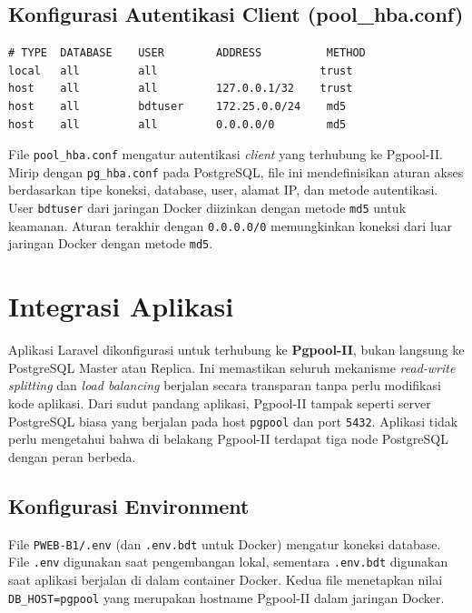 \subsection{Konfigurasi Autentikasi Client (pool\_hba.conf)}

\begin{lstlisting}[caption={Konfigurasi pool\_hba.conf
(docker/pgpool/pool\_hba.conf)}, label={lst:pool-hba}]
# TYPE  DATABASE    USER        ADDRESS          METHOD
local   all         all                         trust
host    all         all         127.0.0.1/32    trust
host    all         bdtuser     172.25.0.0/24    md5
host    all         all         0.0.0.0/0        md5
\end{lstlisting}

File \texttt{pool\_hba.conf} mengatur autentikasi \textit{client} yang
terhubung ke Pgpool-II. Mirip dengan \texttt{pg\_hba.conf} pada
PostgreSQL, file ini mendefinisikan aturan akses berdasarkan tipe
koneksi, database, user, alamat IP, dan metode autentikasi. User
\texttt{bdtuser} dari jaringan Docker diizinkan dengan metode
\texttt{md5} untuk keamanan. Aturan terakhir dengan \texttt{0.0.0.0/0}
memungkinkan koneksi dari luar jaringan Docker dengan metode
\texttt{md5}.

\section{Integrasi Aplikasi}

Aplikasi Laravel dikonfigurasi untuk terhubung ke
\textbf{Pgpool-II}, bukan langsung ke PostgreSQL Master atau Replica.
Ini memastikan seluruh mekanisme \textit{read-write splitting} dan
\textit{load balancing} berjalan secara transparan tanpa perlu
modifikasi kode aplikasi. Dari sudut pandang aplikasi, Pgpool-II
tampak seperti server PostgreSQL biasa yang berjalan pada host
\texttt{pgpool} dan port \texttt{5432}. Aplikasi tidak perlu
mengetahui bahwa di belakang Pgpool-II terdapat tiga node PostgreSQL
dengan peran berbeda.

\subsection{Konfigurasi Environment}

File \texttt{PWEB-B1/.env} (dan \texttt{.env.bdt} untuk Docker)
mengatur koneksi database. File \texttt{.env} digunakan saat
pengembangan lokal, sementara \texttt{.env.bdt} digunakan saat
aplikasi berjalan di dalam container Docker. Kedua file menetapkan
nilai \texttt{DB\_HOST=pgpool} yang merupakan hostname Pgpool-II dalam
jaringan Docker.

